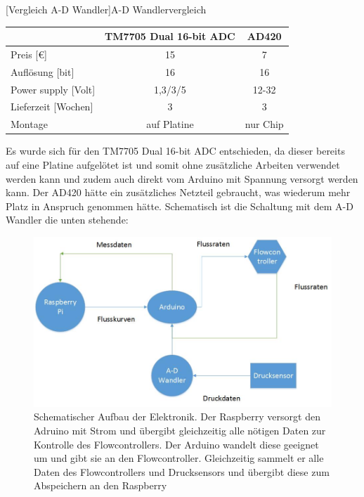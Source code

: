 \begin{center}
	[Vergleich A-D Wandler]{A-D Wandlervergleich}
\begin{tabular}{l|c|c}
	& TM7705 Dual 16-bit ADC & AD420 \\ 
	\hline Preis [\euro]	& 15  & 7 \\ 
	\hline Auflösung [bit]	& 16  & 16 \\ 
	\hline Power supply [Volt]	& 1,3/3/5  & 12-32 \\ 
	\hline Lieferzeit [Wochen]	& 3  & 3 \\ 
	\hline Montage 	& auf Platine  & nur Chip \\ 
\end{tabular} 	
\end{center}


Es wurde sich für den TM7705 Dual 16-bit ADC entschieden, da dieser bereits auf eine Platine aufgelötet ist und somit ohne zusätzliche Arbeiten verwendet werden kann und zudem auch direkt vom Arduino mit Spannung versorgt werden kann. Der AD420 hätte ein zusätzliches Netzteil gebraucht, was wiederum mehr Platz in Anspruch genommen hätte. Schematisch ist die Schaltung mit dem A-D Wandler die unten stehende:


\begin{figure}[h!]
	\begin{center}
		\includegraphics[scale=0.6]{Schema_Elektronik.jpg}
		\caption[Schema Elektronik]{Schematischer Aufbau der Elektronik. Der Raspberry versorgt den Adruino mit Strom und übergibt gleichzeitig alle nötigen Daten zur Kontrolle des Flowcontrollers. Der Arduino wandelt diese geeignet um und gibt sie an den Flowcontroller. Gleichzeitig sammelt er alle Daten des Flowcontrollers und Drucksensors und übergibt diese zum Abspeichern an den Raspberry}
	\end{center}
\end{figure}


